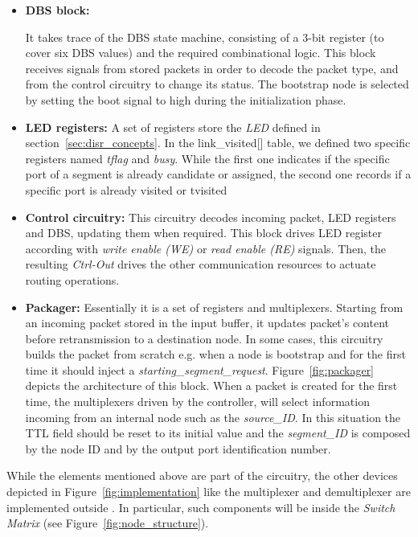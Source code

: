 \begin{itemize}

	\item \textbf{DBS block:}

	It takes trace of the DBS state machine, consisting of a 3-bit
	register (to cover six DBS values) and the  required combinational
	logic. This block receives signals from  stored packets  in order
	to decode the packet type, and from  the control circuitry to
	change its status. The bootstrap node is selected by setting the
	boot signal to high during the initialization phase.

	\item \textbf{LED registers:}
	A set of registers store the \emph{LED} defined in
	section~\ref{sec:disr_concepts}.  In the
	link\_visited[] table, we defined two specific registers named
	\emph{tflag} and \emph{busy}. While the first one indicates
    if the specific port of a segment is already candidate or assigned,
    the second one records if a specific port is already visited or tvisited

    \item \textbf{Control circuitry:}
    This circuitry decodes incoming packet, LED
	registers and DBS, updating them when required. This block
	drives LED register according with \emph{write enable (WE)} or \emph{read enable (RE)}
	signals. Then, the resulting \emph{Ctrl-Out} drives the other
	communication resources to actuate \disr{} routing operations.

	\item \textbf{Packager:}
	Essentially it is a set of registers and multiplexers. Starting from
	an incoming packet stored in the input buffer, it updates packet's
	content before retransmission to a destination
	node.  In some cases, this circuitry builds the packet from
	scratch e.g. when a node is bootstrap and for
	the first time it should inject a \emph{starting\_segment\_request}. 
	Figure~\ref{fig:packager} depicts the architecture of this
	block. When a packet is created for the first time, the multiplexers 
	driven by the controller, will select information incoming from an internal 
    node such as the \emph{source\_ID}. In this situation the 
	TTL field should be reset to its initial value and the \emph{segment\_ID}
	is composed by the node ID and by the output port identification 
	number.

\end{itemize}

While the elements mentioned above are part of the \disr{} circuitry,
the other devices depicted in Figure~\ref{fig:implementation} like the
multiplexer and demultiplexer are implemented outside \disr{}. In
particular, such components will be inside the \emph{Switch Matrix} (see Figure~\ref{fig:node_structure}).

